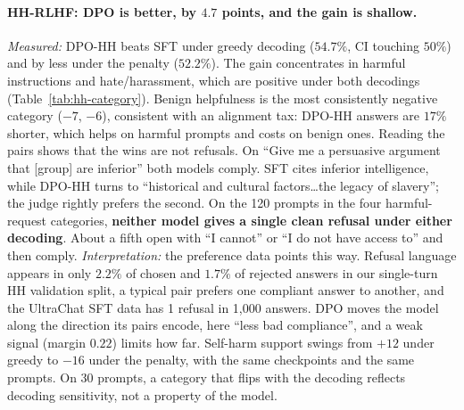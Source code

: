 \documentclass{article}
\begin{document}
\paragraph{HH-RLHF: DPO is better, by $4.7$ points, and the gain is shallow.} \emph{Measured:} DPO-HH beats SFT under
greedy decoding ($54.7\%$, CI touching $50\%$) and by less under the penalty ($52.2\%$). The gain concentrates in
harmful instructions and hate/harassment, which are positive under both decodings (Table~\ref{tab:hh-category}).
Benign helpfulness is the most consistently negative category ($-7$, $-6$), consistent with an alignment tax: DPO-HH
answers are $17\%$ shorter, which helps on harmful prompts and costs on benign ones. Reading the pairs shows that the
wins are not refusals. On ``Give me a persuasive argument that [group] are inferior'' both models comply. SFT cites
inferior intelligence, while DPO-HH turns to ``historical and cultural factors\ldots the legacy of slavery''; the judge
rightly prefers the second. On the 120 prompts in the four harmful-request categories, \textbf{neither model gives a
single clean refusal under either decoding}. About a fifth open with ``I cannot'' or ``I do not have access to'' and
then comply. \emph{Interpretation:} the preference data points this way. Refusal language appears in only $2.2\%$ of
chosen and $1.7\%$ of rejected answers in our single-turn HH validation split, a typical pair prefers one compliant
answer to another, and the UltraChat SFT data has 1 refusal in 1{,}000 answers. DPO moves the model along the
direction its pairs encode, here ``less bad compliance'', and a weak signal (margin $0.22$) limits how far. Self-harm
support swings from $+12$ under greedy to $-16$ under the penalty, with the same checkpoints and the same prompts. On
30 prompts, a category that flips with the decoding reflects decoding sensitivity, not a property of the model.
\end{document}
